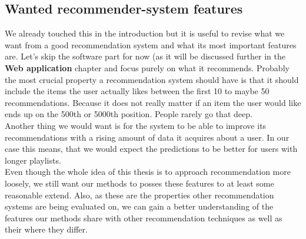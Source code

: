 \subsection{Wanted recommender-system features}
We already touched this in the introduction but it is useful to revise what we want from a good recommendation system and what its most important features are. Let's skip the software part for now (as it will be discussed further in the \textbf{Web application} chapter and focus purely on what it recommends. Probably the most crucial property a recommendation system should have is that it should include the items the user actually likes between the first 10 to maybe 50 recommendations. Because it does not really matter if an item the user would like ends up on the 500th or 5000th position. People rarely go that deep. \\
Another thing we would want is for the system to be able to improve its recommendations with a rising amount of data it acquires about a user. In our case this means, that we would expect the predictions to be better for users with longer playlists. \\
Even though the whole idea of this thesis is to approach recommendation more loosely, we still want our methods to posses these features to at least some reasonable extend. Also, as these are the properties other recommendation systems are being evaluated on, we can gain a better understanding of the features our methods share with other recommendation techniques as well as their where they differ. 
